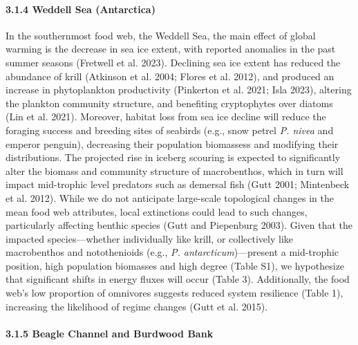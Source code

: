 \documentclass[
]{article}
\begin{document}
\paragraph{3.1.4 Weddell Sea
(Antarctica)}\label{weddell-sea-antarctica-1}

In the southernmost food web, the Weddell Sea, the main effect of global
warming is the decrease in sea ice extent, with reported anomalies in
the past summer seasons (Fretwell et al. 2023). Declining sea ice extent
has reduced the abundance of krill (Atkinson et al. 2004; Flores et al.
2012), and produced an increase in phytoplankton productivity (Pinkerton
et al. 2021; Isla 2023), altering the plankton community structure, and
benefiting cryptophytes over diatoms (Lin et al. 2021). Moreover,
habitat loss from sea ice decline will reduce the foraging success and
breeding sites of seabirds (e.g., snow petrel \emph{P. nivea} and
emperor penguin), decreasing their population biomassess and modifying
their distributions. The projected rise in iceberg scouring is expected
to significantly alter the biomass and community structure of
macrobenthos, which in turn will impact mid-trophic level predators such
as demersal fish (Gutt 2001; Mintenbeck et al. 2012). While we do not
anticipate large-scale topological changes in the mean food web
attributes, local extinctions could lead to such changes, particularly
affecting benthic species (Gutt and Piepenburg 2003). Given that the
impacted species---whether individually like krill, or collectively like
macrobenthos and notothenioids (e.g., \emph{P. antarcticum})---present a
mid-trophic position, high population biomasses and high degree (Table
S1), we hypothesize that significant shifts in energy fluxes will occur
(Table 3). Additionally, the food web's low proportion of omnivores
suggests reduced system resilience (Table 1), increasing the likelihood
of regime changes (Gutt et al. 2015).

\paragraph{3.1.5 Beagle Channel and Burdwood
Bank}\label{beagle-channel-and-burdwood-bank}
\end{document}
